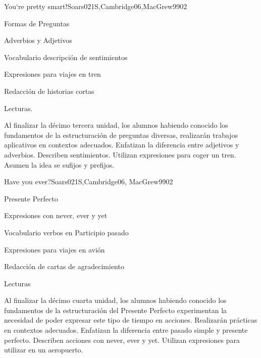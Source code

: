 \begin{syllabus}
\begin{unit}{You`re pretty smart!}{}{Soars021S,Cambridge06,MacGrew99}{0}{2}
\begin{topics}
      \item Formas de Preguntas
      \item Adverbios y Adjetivos
      \item Vocabulario descripción de sentimientos
      \item Expresiones para viajes en tren 
      \item Redacción de historias cortas
      \item Lecturas.
   \end{topics}

   \begin{learningoutcomes}
      \item Al finalizar la décimo tercera unidad, los alumnos habiendo conocido los fundamentos de la estructuración de preguntas diversas, realizarán trabajos aplicativos en contextos adecuados. Enfatizan la diferencia entre adjetivos y adverbios. Describen sentimientos. Utilizan expresiones para coger un tren. Asumen la idea se sufijos y prefijos.
   \end{learningoutcomes}

\end{unit}

\begin{unit}{Have you ever?}{}{Soars021S,Cambridge06, MacGrew99}{0}{2}
   \begin{topics}
      \item Presente Perfecto
      \item Expresiones con never, ever y yet
      \item Vocabulario verbos en Participio pasado
      \item Expresiones para viajes en avión 
      \item Redacción de cartas de agradecimiento
      \item Lecturas
   \end{topics}

   \begin{learningoutcomes}
      \item Al finalizar la décimo cuarta unidad, los alumnos habiendo conocido los fundamentos de la estructuración del Presente Perfecto experimentan la necesidad de poder expresar este tipo de tiempo en acciones. Realizarán prácticas en contextos adecuados. Enfatizan la diferencia entre pasado simple y presente perfecto. Describen acciones con never, ever y yet. Utilizan expresiones para utilizar en un aeropuerto.
   \end{learningoutcomes}

\end{unit}



\begin{coursebibliography}
\end{coursebibliography}

\end{syllabus}
%
